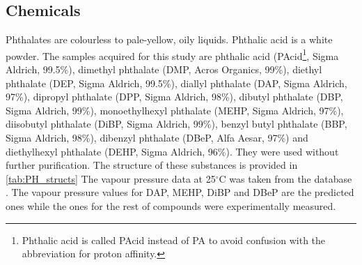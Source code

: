 \subsection{Chemicals}
Phthalates are colourless to pale-yellow, oily liquids. Phthalic acid is a white powder.
The samples acquired for this study  are
phthalic acid (PAcid\footnote{Phthalic acid is called PAcid instead of PA to avoid confusion with the abbreviation for proton affinity.}, Sigma Aldrich, 99.5\%),                              %
dimethyl phthalate (DMP, Acros Organics, 99\%),                     %
diethyl phthalate (DEP, Sigma Aldrich, 99.5\%),                     %
diallyl phthalate (DAP, Sigma Aldrich, 97\%),                       %
dipropyl phthalate (DPP, Sigma Aldrich, 98\%),                      %
dibutyl phthalate (DBP, Sigma Aldrich, 99\%),                       %
monoethylhexyl phthalate (MEHP, Sigma Aldrich, 97\%),               %
diisobutyl phthalate (DiBP, Sigma Aldrich, 99\%),                   %
benzyl butyl phthalate (BBP, Sigma Aldrich, 98\%),                  %
dibenzyl phthalate (DBeP, Alfa Aesar, 97\%)                         %
and
diethylhexyl phthalate (DEHP, Sigma Aldrich, 96\%).                 %
They were used without further purification.
%
The structure of these substances is provided in \autoref{tab:PH_structs}
%
The vapour pressure data at 25$^\circ$C was taken from the \citeauthor{USAEPA} database \cite{USAEPA}. The vapour pressure values for DAP, MEHP, DiBP and DBeP are the predicted ones while the ones for the rest of compounds were experimentally measured.

